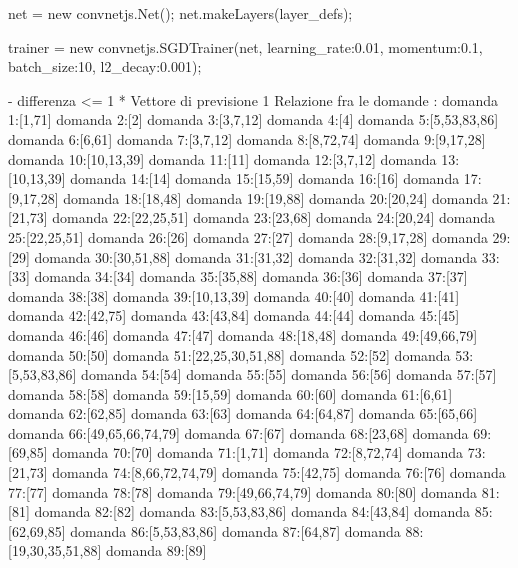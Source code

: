 net = new convnetjs.Net();
net.makeLayers(layer_defs);

trainer = new convnetjs.SGDTrainer(net, {learning_rate:0.01, momentum:0.1, batch_size:10, l2_decay:0.001});

- differenza <= 1
* Vettore di previsione 1
Relazione fra le domande :
domanda 1:[1,71]
domanda 2:[2]
domanda 3:[3,7,12]
domanda 4:[4]
domanda 5:[5,53,83,86]
domanda 6:[6,61]
domanda 7:[3,7,12]
domanda 8:[8,72,74]
domanda 9:[9,17,28]
domanda 10:[10,13,39]
domanda 11:[11]
domanda 12:[3,7,12]
domanda 13:[10,13,39]
domanda 14:[14]
domanda 15:[15,59]
domanda 16:[16]
domanda 17:[9,17,28]
domanda 18:[18,48]
domanda 19:[19,88]
domanda 20:[20,24]
domanda 21:[21,73]
domanda 22:[22,25,51]
domanda 23:[23,68]
domanda 24:[20,24]
domanda 25:[22,25,51]
domanda 26:[26]
domanda 27:[27]
domanda 28:[9,17,28]
domanda 29:[29]
domanda 30:[30,51,88]
domanda 31:[31,32]
domanda 32:[31,32]
domanda 33:[33]
domanda 34:[34]
domanda 35:[35,88]
domanda 36:[36]
domanda 37:[37]
domanda 38:[38]
domanda 39:[10,13,39]
domanda 40:[40]
domanda 41:[41]
domanda 42:[42,75]
domanda 43:[43,84]
domanda 44:[44]
domanda 45:[45]
domanda 46:[46]
domanda 47:[47]
domanda 48:[18,48]
domanda 49:[49,66,79]
domanda 50:[50]
domanda 51:[22,25,30,51,88]
domanda 52:[52]
domanda 53:[5,53,83,86]
domanda 54:[54]
domanda 55:[55]
domanda 56:[56]
domanda 57:[57]
domanda 58:[58]
domanda 59:[15,59]
domanda 60:[60]
domanda 61:[6,61]
domanda 62:[62,85]
domanda 63:[63]
domanda 64:[64,87]
domanda 65:[65,66]
domanda 66:[49,65,66,74,79]
domanda 67:[67]
domanda 68:[23,68]
domanda 69:[69,85]
domanda 70:[70]
domanda 71:[1,71]
domanda 72:[8,72,74]
domanda 73:[21,73]
domanda 74:[8,66,72,74,79]
domanda 75:[42,75]
domanda 76:[76]
domanda 77:[77]
domanda 78:[78]
domanda 79:[49,66,74,79]
domanda 80:[80]
domanda 81:[81]
domanda 82:[82]
domanda 83:[5,53,83,86]
domanda 84:[43,84]
domanda 85:[62,69,85]
domanda 86:[5,53,83,86]
domanda 87:[64,87]
domanda 88:[19,30,35,51,88]
domanda 89:[89]

